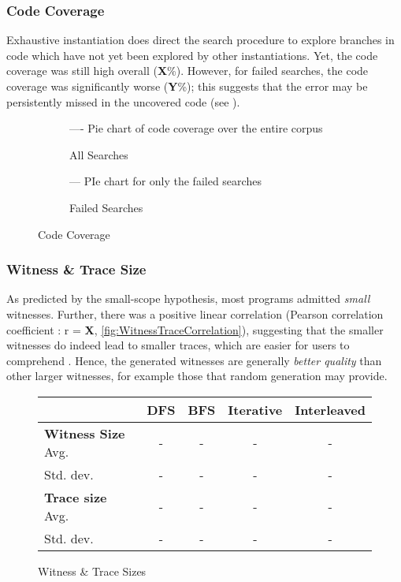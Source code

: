 \subsubsection{Code Coverage}
Exhaustive instantiation does direct the search procedure to explore branches in code which have not yet been explored by other instantiations. Yet, the code coverage was still high overall (\textbf{X}\%). However, for failed searches, the code coverage was significantly worse (\textbf{Y}\%); this suggests that the error may be persistently missed in the uncovered code (see ).

\begin{figure}\centering
\begin{subfigure}{.5\textwidth}
---- Pie chart of code coverage over the entire corpus
\caption{All Searches}
\end{subfigure}
\begin{subfigure}{.5\textwidth}
--- PIe chart for only the failed searches
\caption{Failed Searches}
\end{subfigure}
\caption{Code Coverage}
\label{fig:CodeCoverage}
\end{figure}

\subsubsection{Witness \& Trace Size}
As predicted by the small-scope hypothesis, most programs admitted \textit{small} witnesses. Further, there was a positive linear correlation (Pearson correlation coefficient \cite{PearsonCorrelation}: r = \textbf{X}, \cref{fig:WitnessTraceCorrelation}), suggesting that the smaller witnesses do indeed lead to smaller traces, which are easier for users to comprehend \cite{SmallerTraces}. Hence, the generated witnesses are generally \textit{better quality} than other larger witnesses, for example those that random generation may provide.

\begin{figure}\centering
\begin{tabular}{l|cccc}
& DFS & BFS & Iterative & Interleaved\\
\hline
\textbf{Witness Size} Avg. & -& -& -& -\\
Std. dev. & -& -& -& -\\
\textbf{Trace size} Avg. & -& -& -& -\\
Std. dev. & -& -& -& -
\end{tabular}
\caption{Witness \& Trace Sizes}
\label{fig:WitnessSize}
\end{figure}

